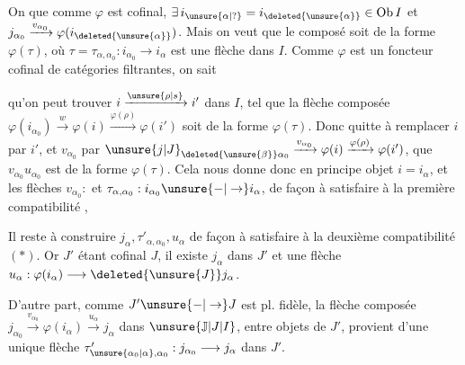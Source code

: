 On  que comme $\varphi$ est cofinal, $\exists\,i_{\unsure{\alpha|?}}=i_{\deleted{\unsure{\alpha}}}\in\operatorname{Ob} I$ et $j_{\alpha_0}\xrightarrow{v_{\alpha_0}}\varphi(i_{\deleted{\unsure{\alpha}}})$. Mais on veut que le composé
soit de la forme $\varphi(\tau)$, où $\tau=\tau_{\alpha,\alpha_0}:i_{\alpha_0}\longrightarrow i_\alpha$ est une flèche dans $I$. Comme $\varphi$ est un foncteur cofinal de catégories filtrantes, on sait

qu'on peut trouver $i\xrightarrow{\unsure{\rho|s}}i'$ dans $I$, tel que la flèche composée $\varphi(i_{\alpha_0})\xrightarrow{w}\varphi(i)\xrightarrow{\varphi(\rho)}\varphi(i')$
soit de la forme $\varphi(\tau)$. Donc quitte à remplacer $i$ par $i'$, et $v_{\alpha_0}$ par    $\unsure{j|J}_{\deleted{\unsure{\beta}}\alpha_0}\xrightarrow{v_{\alpha_0}}\varphi(i)\xrightarrow{\varphi(\rho)}\varphi(i')$, 
  que $v_{\alpha_0}u_{\alpha_0}$ est de la forme $\varphi(\tau)$. Cela nous donne donc en principe objet $i=i_\alpha$, et les flèches $v_{\alpha_0}:$  et $\tau_{\alpha,\alpha_0}:i_{\alpha_0}\unsure{-|\to}i_\alpha$, de façon à satisfaire à la première compatibilité  ,

Il reste à construire $j_\alpha,\tau'_{\alpha,\alpha_0},u_\alpha$ de façon à satisfaire à la deuxième compatibilité $(*)$. Or $J'$ étant cofinal  $J$, il existe $j_\alpha$ dans $J'$ et une flèche $u_\alpha:\varphi(i_\alpha)\longrightarrow\deleted{\unsure{J}}j_\alpha$.

D'autre part, comme $J'\unsure{-|\to}J$ est pl. fidèle, la flèche composée $j_{\alpha_0}\xrightarrow{v_{\alpha_0}}\varphi(i_\alpha)\xrightarrow{u_\alpha}j_\alpha$ dans $\unsure{\mathbb{J}|J|I}$, entre objets de $J'$, provient d'une unique flèche $\tau'_{\unsure{\alpha_0|\alpha},\alpha_0}:j_{\alpha_0}\longrightarrow j_\alpha$ dans $J'$.

